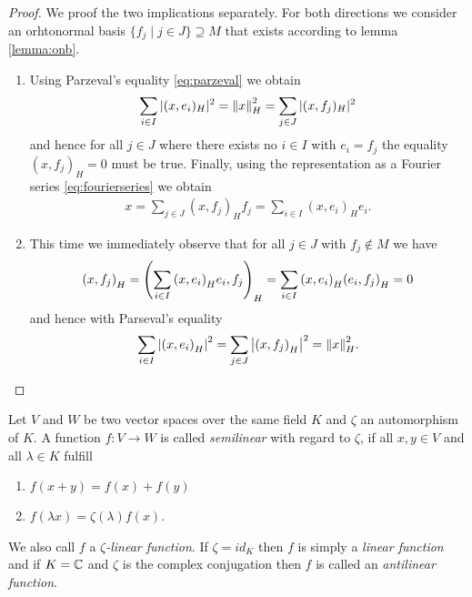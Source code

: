 \begin{proof}
	We proof the two implications separately. For both directions we consider an orhtonormal basis $\{f_j \mid j \in J\} \supseteq M$ that exists according to lemma \ref{lemma:onb}. 
	\begin{enumerate}
		\item[\Quote{$\Rightarrow$}]  Using Parzeval's equality \eqref{eq:parzeval} we obtain
		\begin{align*}
		\sum_{i \in I} |(x, e_i)_H|^2 = \norm[H]{x}^2 = \sum_{j \in J} |(x,f_j)_H|^2
		\end{align*}
		and hence for all $j \in J$ where there exists no $i \in I$ with $e_i = f_j$ the equality $(x, f_j)_H = 0$ must be true. Finally, using the representation as a Fourier series \eqref{eq:fourierseries} we obtain
		\begin{align*}
		x = \sum_{j \in J} (x,f_j)_H f_j = \sum_{i \in I} (x,e_i)_H e_i.
		\end{align*}
		
		\item[\Quote{$\Leftarrow$}] This time we immediately observe that for all $j \in J$ with $f_j \notin M$ we have 
		\begin{align*}
			\pbraces{x, f_j}_H = \pbraces{\sum_{i \in I} \pbraces{x, e_i}_H e_i, f_j}_H = \sum_{i \in I} \pbraces{x, e_i}_H \pbraces{e_i, f_j}_H = 0
		\end{align*}
		and hence with Parseval's equality
		\begin{align*}
			\sum_{i \in I} \vbraces{\pbraces{x,e_i}_H}^2 = \sum_{j \in J} \vbraces{\pbraces{x,f_j}_H}^2 = \norm[H]{x}^2.
		\end{align*}
	\end{enumerate}
	
\end{proof}



\begin{definition}
	Let $V$ and $W$ be two vector spaces over the same field $K$ and $\zeta$ an automorphism of $K$. A function $f: V \to W$ is called \textit{semilinear} with regard to $\zeta$, if all $x,y \in V$ and all $\lambda \in K$ fulfill
	\begin{enumerate}
		\item $f(x + y) = f(x) + f(y)$
		\item $f(\lambda x) = \zeta(\lambda) f(x)$.
	\end{enumerate}
	We also call $f$ a $\zeta$\textit{-linear function}. If $\zeta = id_K$ then $f$ is simply a \textit{linear function} and if $K = \C$ and $\zeta$ is the complex conjugation then $f$ is called an \textit{antilinear function}.
\end{definition}


